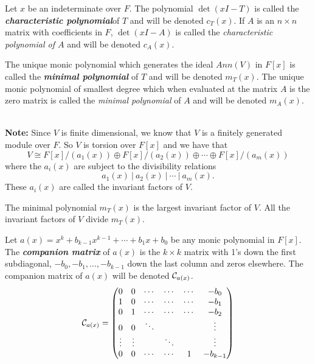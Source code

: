 \nl

\begin{defn}
Let $x$ be an indeterminate over $F$. The polynomial $\det(xI - T)$ is called the \textit{\textbf{characteristic polynomial}}of $T$ and will be denoted $c_T(x)$. If $A$ is an $n\times n$ matrix with coefficients in $F$, $\det(xI- A)$ is called the \textit{characteristic polynomial of $A$} and will be denoted $c_A(x)$.
\end{defn}

\nl

\begin{defn}
The unique monic polynomial which generates the ideal $Ann(V)$ in $F[x]$ is called the \textit{\textbf{minimal polynomial}} of $T$ and will be denoted $m_T(x)$. The unique monic polynomial of smallest degree which when evaluated at the matrix $A$ is the zero matrix is called the \textit{minimal polynomial} of $A$  and will be denoted $m_A(x)$.
\end{defn}
\nl\\
\textbf{Note:} Since $V$ is finite dimensional, we know that $V$ is a finitely generated module over $F$. So $V$ is torsion over $F[x]$ and we have that
\[V\cong F[x]/(a_1(x)) \oplus F[x]/(a_2(x))\oplus \cdots \oplus F[x]/(a_m(x))\]
where the $a_i(x)$ are subject to the divisibility relations
\[a_1(x)\ |\  a_2(x)\ |\ \cdots\ |\  a_m(x).\]
These $a_i(x)$ are called the invariant factors of $V$.

\nl

\begin{prop}
The minimal polynomial $m_T(x)$ is the largest invariant factor of $V$. All the invariant factors of $V$ divide $m_T(x)$.
\end{prop}

\nl

\begin{defn}
Let $a(x) = x^k + b_{k - 1}x^{k - 1} + \cdots + b_1 x + b_0$ be any monic polynomial in $F[x]$. The \textit{\textbf{companion matrix}} of $a(x)$ is the $k\times k$ matrix with 1's down the first subdiagonal, $-b_0, -b_1, \ldots, -b_{k - 1}$ down the last column and zeros elsewhere. The companion matrix of $a(x)$ will be denoted $\mathcal{C}_{a(x)}$.
\[\mathcal{C}_{a(x)} = \begin{pmatrix}
0 & 0 & \cdots & \cdots & \cdots & -b_0\\
1 & 0 & \cdots & \cdots & \cdots & -b_1\\
0 & 1 & \cdots & \cdots & \cdots & -b_2\\
0 & 0 & \ddots &  &  & \vdots\\
\vdots & \vdots & & \ddots  &  & \vdots\\
0 & 0 & \cdots & \cdots & 1 & -b_{k - 1}\\
\end{pmatrix}\]
\end{defn}



